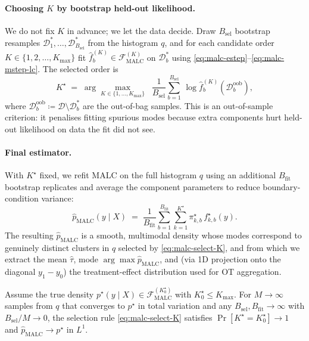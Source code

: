 \paragraph{Choosing $K$ by bootstrap held-out likelihood.}
We do not fix $K$ in advance; we let the data decide. Draw $B_{\text{sel}}$
bootstrap resamples $\mathcal{D}_1^*, \dots, \mathcal{D}_{B_{\text{sel}}}^*$
from the histogram $q$, and for each candidate order
$K \in \{1, 2, \dots, K_{\max}\}$ fit
$\hat{f}^{(K)}_{b} \in \mathcal{F}_{\mathrm{MALC}}^{(K)}$
on $\mathcal{D}_b^*$ using \eqref{eq:malc-estep}--\eqref{eq:malc-mstep-lc}.
The selected order is
\begin{equation}
K^{\star}
\;=\;
\arg\!\max_{K \in \{1,\dots,K_{\max}\}}
\;\;\frac{1}{B_{\text{sel}}}\sum_{b=1}^{B_{\text{sel}}}\,
\log \hat{f}^{(K)}_{b}\!\left(\mathcal{D}_b^{\mathrm{oob}}\right),
\label{eq:malc-select-K}
\end{equation}
where $\mathcal{D}_b^{\mathrm{oob}} \coloneqq \mathcal{D} \setminus \mathcal{D}_b^*$
are the out-of-bag samples. This is an out-of-sample criterion: it
penalises fitting spurious modes because extra components hurt held-out
likelihood on data the fit did not see.

\paragraph{Final estimator.}
With $K^{\star}$ fixed, we refit MALC on the full histogram
$q$ using an additional $B_{\text{fit}}$ bootstrap replicates and average
the component parameters to reduce boundary-condition variance:
\begin{equation}
\hat{p}_{\mathrm{MALC}}(y \mid X)
\;=\;
\frac{1}{B_{\text{fit}}}\sum_{b=1}^{B_{\text{fit}}}
\sum_{k=1}^{K^{\star}} \pi_{k,b}^{\star}\, f_{k,b}^{\star}(y).
\label{eq:malc-final}
\end{equation}
The resulting $\hat{p}_{\mathrm{MALC}}$ is a smooth, multimodal density
whose modes correspond to genuinely distinct clusters in $q$ selected by
\eqref{eq:malc-select-K}, and from which we extract the mean $\hat{\tau}$,
mode $\arg\!\max\hat{p}_{\mathrm{MALC}}$, and (via 1D projection onto the
diagonal $y_1 - y_0$) the treatment-effect distribution used for OT
aggregation.

\begin{proposition}
\label{prop:malc-consistency}
Assume the true density
$p^{\star}(y \mid X) \in \mathcal{F}_{\mathrm{MALC}}^{(K^{\star}_{0})}$
with $K^{\star}_{0} \le K_{\max}$.
For $M \to \infty$ samples from $q$ that converges to $p^{\star}$ in total
variation and any $B_{\text{sel}}, B_{\text{fit}} \to \infty$ with
$B_{\text{sel}}/M \to 0$, the selection rule
\eqref{eq:malc-select-K} satisfies
$\Pr\left[K^{\star} = K^{\star}_{0}\right] \to 1$
and $\hat{p}_{\mathrm{MALC}} \to p^{\star}$ in $L^{1}$.
\end{proposition}

